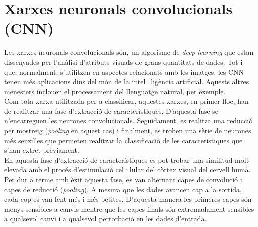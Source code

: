 \documentclass[a4paper,12pt]{report}
\begin{document}
\section*{Xarxes neuronals convolucionals (CNN)}
Les xarxes neuronals convolucionals són, un algorisme de \textit{deep learning} que estan dissenyades per l'anàlisi d'atributs visuals de grans quantitats de dades. Tot i que, normalment, s'utilitzen en aspectes relacionats amb les imatges, les CNN tenen més aplicacions dins del món de la intel·ligència artificial. Aquests altres menesters inclouen el processament del llenguatge natural, per exemple.\\
Com tota xarxa utilitzada per a classificar, aquestes xarxes, en primer lloc, han de realitzar una fase d'extracció de característiques. D'aquesta fase se n'encarreguen les neurones convolucionals. Seguidament, es realitza una reducció per mostreig (\textit{pooling} en aquest cas) i finalment, es troben una sèrie de neurones més senzilles que permeten realitzar la classificació de les característiques que s'han extret prèviament.\\
En aquesta fase d'extracció de característiques es pot trobar una similitud molt elevada amb el procés d'estimulació cel·lular del còrtex visual del cervell humà.\\
Per dur a terme amb èxit aquesta fase, es van alternant capes de convolució i capes de reducció (\textit{pooling}). A mesura que les dades avancen cap a la sortida, cada cop es van fent més i més petites. D'aquesta manera les primeres capes són menys sensibles a canvis mentre que les capes finals són extremadament sensibles a qualsevol canvi i a qualsevol pertorbació en les dades d'entrada.
\end{document}
